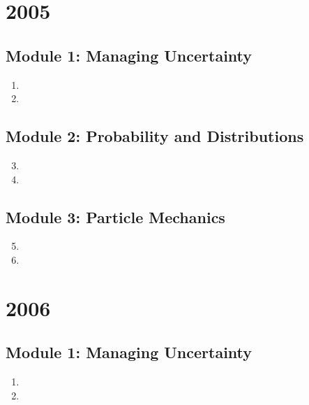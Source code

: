 \documentclass[fleqn,titlepage]{book}
\numberwithin{equation}{section}
\theoremstyle{plain}
\theoremstyle{definition}
\theoremstyle{remark}
\begin{document}
\chapter{2005}
\section{Module 1: Managing Uncertainty}
\begin{enumerate}[label=\bfseries  \arabic*.]\setcounter{enumi}{0}
\item 
\item 
\end{enumerate}
\section{Module 2: Probability and Distributions}
\begin{enumerate}[label=\bfseries  \arabic*.]\setcounter{enumi}{2}
\item 
\item 
\end{enumerate}
\section{Module 3: Particle Mechanics}
\begin{enumerate}[label=\bfseries  \arabic*.]\setcounter{enumi}{4}
\item 
\item 
\end{enumerate}

\chapter{2006}
\section{Module 1: Managing Uncertainty}
\begin{enumerate}[label=\bfseries  \arabic*.]\setcounter{enumi}{0}
\item 
\item 
\end{enumerate}
\end{document}
